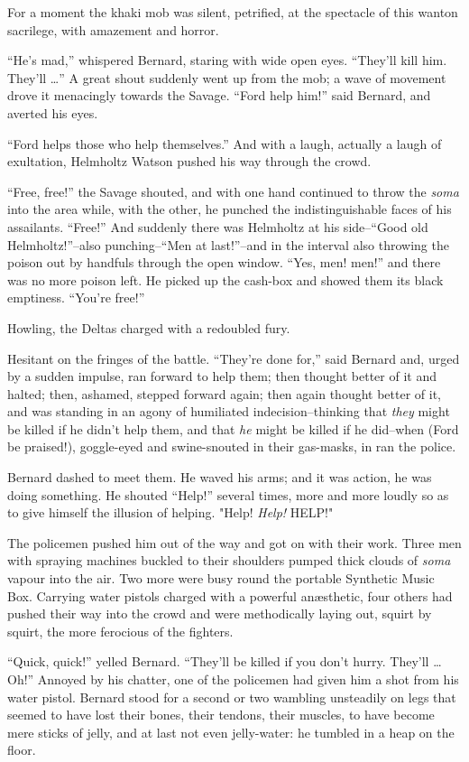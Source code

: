\documentclass[12pt]{report}
\begin{document}
For a moment the khaki mob was silent, petrified, at the spectacle of
this wanton sacrilege, with amazement and horror.

``He's mad,'' whispered Bernard, staring with wide open eyes. ``They'll
kill him. They'll \ldots{}'' A great shout suddenly went up from the
mob; a wave of movement drove it menacingly towards the Savage. ``Ford
help him!'' said Bernard, and averted his eyes.

``Ford helps those who help themselves.'' And with a laugh, actually a
laugh of exultation, Helmholtz Watson pushed his way through the crowd.

``Free, free!'' the Savage shouted, and with one hand continued to throw
the \emph{soma} into the area while, with the other, he punched the
indistinguishable faces of his assailants. ``Free!'' And suddenly there
was Helmholtz at his side--``Good old Helmholtz!''--also punching--``Men
at last!''--and in the interval also throwing the poison out by handfuls
through the open window. ``Yes, men! men!'' and there was no more poison
left. He picked up the cash-box and showed them its black emptiness.
``You're free!''

Howling, the Deltas charged with a redoubled fury.

Hesitant on the fringes of the battle. ``They're done for,'' said
Bernard and, urged by a sudden impulse, ran forward to help them; then
thought better of it and halted; then, ashamed, stepped forward again;
then again thought better of it, and was standing in an agony of
humiliated indecision--thinking that \emph{they} might be killed if he
didn't help them, and that \emph{he} might be killed if he did--when
(Ford be praised!), goggle-eyed and swine-snouted in their gas-masks, in
ran the police.

Bernard dashed to meet them. He waved his arms; and it was action, he
was doing something. He shouted ``Help!'' several times, more and more
loudly so as to give himself the illusion of helping. "Help!
\emph{Help!} HELP!"

The policemen pushed him out of the way and got on with their work.
Three men with spraying machines buckled to their shoulders pumped thick
clouds of \emph{soma} vapour into the air. Two more were busy round the
portable Synthetic Music Box. Carrying water pistols charged with a
powerful anæsthetic, four others had pushed their way into the crowd and
were methodically laying out, squirt by squirt, the more ferocious of
the fighters.

``Quick, quick!'' yelled Bernard. ``They'll be killed if you don't
hurry. They'll \ldots{} Oh!'' Annoyed by his chatter, one of the
policemen had given him a shot from his water pistol. Bernard stood for
a second or two wambling unsteadily on legs that seemed to have lost
their bones, their tendons, their muscles, to have become mere sticks of
jelly, and at last not even jelly-water: he tumbled in a heap on the
floor.
\end{document}
